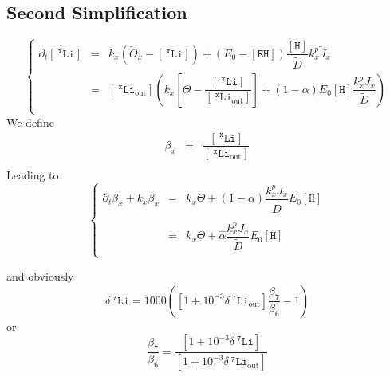 \documentclass[aps,onecolumn,12pt]{revtex4}
\newcommand{\mychem}[1]{\mathtt{#1}}
\newcommand{\myconc}[1]{\left\lbrack{#1}\right\rbrack}
\newcommand{\spLi}[1]{{~^{\mychem{#1}}\mychem{Li}}}
\newcommand{\Li}[1]{\myconc{\spLi{#1}}}
\newcommand{\spLiOut}[1]{{\spLi{#1}}_{\mathrm{out}}}
\newcommand{\LiOut}[1]{\myconc{\spLiOut{#1}}}
\newcommand{\spEHin}{\mychem{EH}}
\newcommand{\EHin}{\myconc{\spEHin}}
\newcommand{\spproton}{\mychem{H}}
\newcommand{\proton}{\myconc{\spproton}}
\newcommand{\deltaLi}{ {\delta\!\!\!\spLi{7}} }
\newcommand{\deltaLiOut}{{\deltaLi}_{\mathrm{out}}}
\begin{document}
\subsection{Second Simplification}
\begin{equation}
\left\lbrace
\begin{array}{rcl}
\partial_t\Li{x} & = & k_x \left(\tilde{\Theta}_x -\Li{x} \right)  + \left(E_0-\EHin\right) \dfrac{\proton}{\tilde{D}}   k_x^p \tilde{J}_x %
\\
 &=&   \LiOut{x} \left( k_x
 	\left[\Theta-\dfrac{\Li{x}}{\LiOut{x}}\right] 
	+ \left(1-\alpha\right) E_0 \proton \dfrac{ k_x^p J_x}{\tilde{D}}
  \right) \\
\end{array}
\right.
\end{equation}
We define
\begin{equation}
\begin{array}{rcl}
\beta_x & = & \dfrac{\Li{x}}{\LiOut{x}} \\
\end{array}
\end{equation}
Leading to
\begin{equation}
\left\lbrace
\begin{array}{rcl}
\partial_t \beta_x + k_x \beta_x 
& = & k_x \Theta  + \left(1-\alpha\right) \dfrac{ k_x^p J_x}{\tilde{D}} E_0 \proton  %
 \\
\\
& = & k_x \Theta  +  \hat\alpha \dfrac{ k_x^p J_x}{\tilde{D}} E_0 \proton  %
 \\
\end{array}
\right.
\end{equation}

and obviously
\begin{equation}
	\deltaLi = 1000 \left ( \left[1+10^{-3}\deltaLiOut\right] \dfrac{\beta_7}{\beta_6}-1\right)
\end{equation}
or
\begin{equation}
	\dfrac{ \beta_7}{\beta_6} = \dfrac{\left[1+10^{-3}\deltaLi\right]}{\left[1+10^{-3}\deltaLiOut\right]}
\end{equation}
\end{document}
